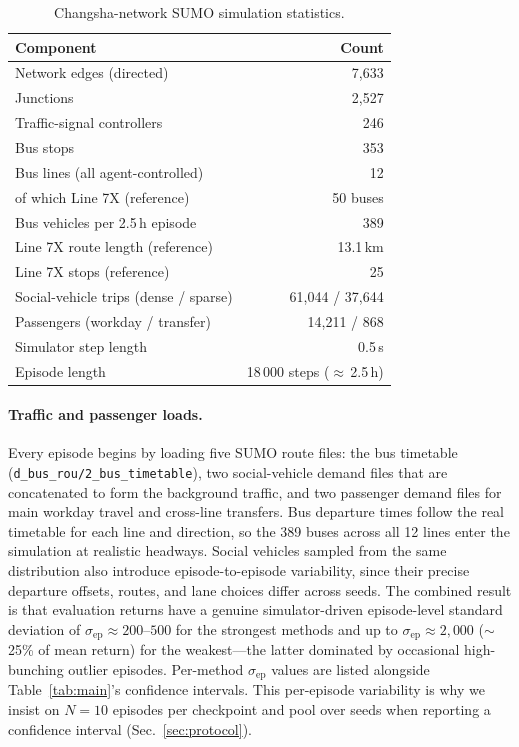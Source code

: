 \documentclass[journal,10pt]{IEEEtran}
\begin{document}
\begin{table}[!htbp]
\centering
\caption{Changsha-network SUMO simulation statistics.}
\label{tab:sumo_stats}
\small
\begin{tabular}{@{}lr@{}}
\toprule
Component & Count \\
\midrule
Network edges (directed) & 7{,}633 \\
Junctions & 2{,}527 \\
Traffic-signal controllers & 246 \\
Bus stops & 353 \\
Bus lines (all agent-controlled) & 12 \\
\quad of which Line 7X (reference) & 50 buses \\
Bus vehicles per 2.5\,h episode & 389 \\
Line 7X route length (reference) & 13.1\,km \\
Line 7X stops (reference) & 25 \\
Social-vehicle trips (dense / sparse) & 61{,}044 / 37{,}644 \\
Passengers (workday / transfer) & 14{,}211 / 868 \\
Simulator step length & 0.5\,s \\
Episode length & 18\,000 steps ($\approx$\,2.5\,h) \\
\bottomrule
\end{tabular}
\end{table}

\paragraph{Traffic and passenger loads.} Every episode begins by loading five SUMO route files: the bus timetable (\texttt{d\_bus\_rou/2\_bus\_timetable}), two social-vehicle demand files that are concatenated to form the background traffic, and two passenger demand files for main workday travel and cross-line transfers. Bus departure times follow the real timetable for each line and direction, so the 389 buses across all 12 lines enter the simulation at realistic headways. Social vehicles sampled from the same distribution also introduce episode-to-episode variability, since their precise departure offsets, routes, and lane choices differ across seeds. The combined result is that evaluation returns have a genuine simulator-driven episode-level standard deviation of $\sigma_{\text{ep}} \approx 200$--$500$ for the strongest methods and up to $\sigma_{\text{ep}} \approx 2{,}000$ ($\sim$25\% of mean return) for the weakest---the latter dominated by occasional high-bunching outlier episodes. Per-method $\sigma_{\text{ep}}$ values are listed alongside Table~\ref{tab:main}'s confidence intervals. This per-episode variability is why we insist on $N=10$ episodes per checkpoint and pool over seeds when reporting a confidence interval (Sec.~\ref{sec:protocol}).
\end{document}
